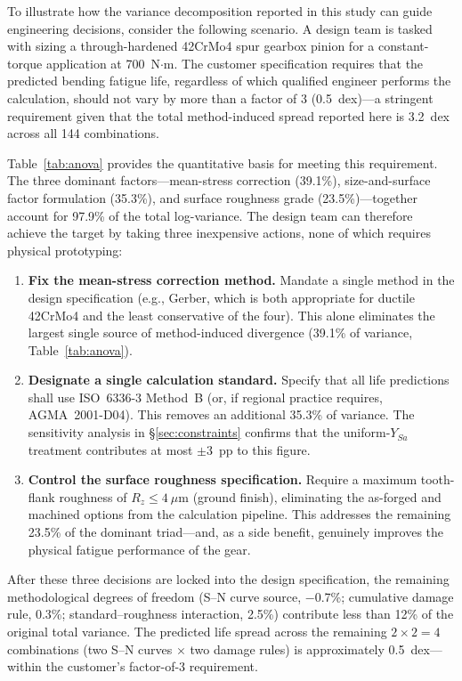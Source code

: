 \documentclass[12pt,a4paper]{article}
\begin{document}
To illustrate how the variance decomposition reported in this study
can guide engineering decisions, consider the following scenario. A
design team is tasked with sizing a through-hardened 42CrMo4 spur
gearbox pinion for a constant-torque application at 700~N$\cdot$m.
The customer specification requires that the predicted bending fatigue
life, regardless of which qualified engineer performs the calculation,
should not vary by more than a factor of 3 (0.5~dex)---a stringent
requirement given that the total method-induced spread reported here is
3.2~dex across all 144 combinations.

Table~\ref{tab:anova} provides the quantitative basis for meeting this
requirement. The three dominant factors---mean-stress correction
(39.1\%), size-and-surface factor formulation (35.3\%), and surface roughness
grade (23.5\%)---together account for 97.9\% of the total
log-variance. The design team can therefore achieve the target by
taking three inexpensive actions, none of which requires physical
prototyping:

\begin{enumerate}
  \item \textbf{Fix the mean-stress correction method.} Mandate a single
        method in the design specification (e.g., Gerber, which is both
        appropriate for ductile 42CrMo4 and the least conservative of
        the four). This alone eliminates the largest single source of
        method-induced divergence (39.1\% of variance, Table~\ref{tab:anova}).
  \item \textbf{Designate a single calculation standard.} Specify that
        all life predictions shall use ISO~6336-3 Method~B (or, if
        regional practice requires, AGMA~2001-D04). This removes an
        additional 35.3\% of variance. The sensitivity analysis in
        \S\ref{sec:constraints} confirms that the uniform-$Y_{Sa}$
        treatment contributes at most $\pm$3~pp to this figure.
  \item \textbf{Control the surface roughness specification.} Require a
        maximum tooth-flank roughness of $R_z \leq 4~\mu$m (ground
        finish), eliminating the as-forged and machined options from the
        calculation pipeline. This addresses the remaining 23.5\% of the
        dominant triad---and, as a side benefit, genuinely improves the
        physical fatigue performance of the gear.
\end{enumerate}

After these three decisions are locked into the design specification,
the remaining methodological degrees of freedom (S--N curve source,
$-$0.7\%; cumulative damage rule, 0.3\%; standard--roughness interaction,
2.5\%) contribute less than 12\% of the original total variance. The
predicted life spread across the remaining $2 \times 2 = 4$
combinations (two S--N curves $\times$ two damage rules) is
approximately 0.5~dex---within the customer's factor-of-3 requirement.
\end{document}
